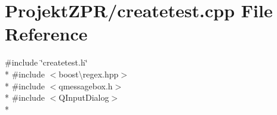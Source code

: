 \section{Projekt\-Z\-P\-R/createtest.cpp File Reference}
\label{createtest_8cpp}
{\ttfamily \#include \char`\"{}createtest.\-h\char`\"{}}\\*
{\ttfamily \#include $<$boost\textbackslash{}regex.\-hpp$>$}\\*
{\ttfamily \#include $<$qmessagebox.\-h$>$}\\*
{\ttfamily \#include $<$Q\-Input\-Dialog$>$}\\*
